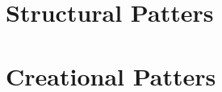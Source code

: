 \documentclass[
    fourColumns,
    landscape,
]{formularyETH/formularyETH}
\begin{document}
\section{Structural Patters}
\label{subsubsec:Behavirol}
\section{Creational Patters}
\label{subsubsec:Behavirol}
% 
% 
\end{document}
